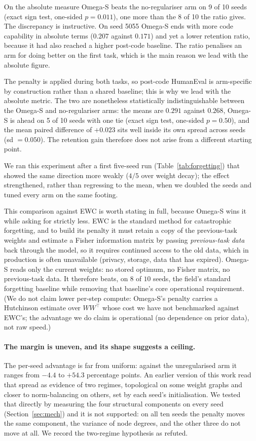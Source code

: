 \documentclass[11pt,a4paper]{article}
\begin{document}
On the absolute measure Omega-S beats the no-regulariser arm on 9 of 10 seeds
(exact sign test, one-sided $p=0.011$), one more than the 8 of 10 the ratio
gives. The discrepancy is instructive. On seed 5055 Omega-S ends with more
code capability in absolute terms ($0.207$ against $0.171$) and yet a lower
retention ratio, because it had also reached a higher post-code baseline. The
ratio penalises an arm for doing better on the first task, which is the main
reason we lead with the absolute figure.

The penalty is applied during both tasks, so post-code HumanEval is
arm-specific by construction rather than a shared baseline; this is why we
lead with the absolute metric. The two are nonetheless statistically
indistinguishable between the Omega-S and no-regulariser arms: the means are
$0.291$ against $0.268$, Omega-S is ahead on 5 of 10 seeds with one tie
(exact sign test, one-sided $p = 0.50$), and the mean paired difference of
$+0.023$ sits well inside its own spread across seeds (sd $=0.050$). The
retention gain therefore does not arise from a different starting point.

We ran this experiment after a first five-seed run
(Table~\ref{tab:forgetting}) that showed the same direction more weakly
($4/5$ over weight decay); the effect strengthened, rather than regressing
to the mean, when we doubled the seeds and tuned every arm on the same
footing.

This comparison against EWC is worth stating in full, because Omega-S wins
it while asking for strictly less. EWC is the standard method for
catastrophic forgetting, and to build its penalty it must retain a copy of
the previous-task weights and estimate a Fisher information matrix by passing
\emph{previous-task data} back through the model, so it requires continued
access to the old data, which in production is often unavailable (privacy,
storage, data that has expired). Omega-S reads only the current weights: no
stored optimum, no Fisher matrix, no previous-task data. It therefore beats,
on $8$ of $10$ seeds, the field's standard forgetting baseline while removing
that baseline's core operational requirement. (We do not claim lower per-step
compute: Omega-S's penalty carries a Hutchinson estimate over $WW^\top$ whose
cost we have not benchmarked against EWC's; the advantage we do claim is
operational (no dependence on prior data), not raw speed.)

\paragraph{The margin is uneven, and its shape suggests a ceiling.} The
per-seed advantage is far from uniform: against the unregularised arm it ranges
from $-4.4$ to $+54.3$ percentage points. An earlier version of this work read
that spread as evidence of two regimes, topological on some weight graphs and
closer to norm-balancing on others, set by each seed's initialisation. We tested
that directly by measuring the four structural components on every seed
(Section~\ref{sec:mech}) and it is not supported: on all ten seeds the penalty
moves the same component, the variance of node degrees, and the other three do
not move at all. We record the two-regime hypothesis as refuted.
\end{document}
